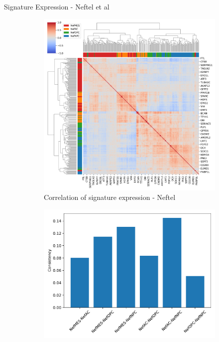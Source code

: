 \documentclass[aspectratio=169,9pt]{beamer}
\begin{document}
    \begin{frame}{Signature Expression - Neftel et al}
        \begin{adjustwidth}{-5cm}{-5cm}
            \centering
            \begin{figure}\ContinuedFloat
                \centering
                \begin{subfigure}[c]{0.48\textwidth}
                    \centering
                    \includegraphics[width=\textwidth]{GSM3828672_Corrplot_Nef}
                    \caption{Correlation of signature expression - Neftel}
                \end{subfigure}
                \begin{subfigure}[c]{0.4\textwidth}
                    \centering
                    \includegraphics[width=\textwidth]{GSM3828672_Consistency_Nef}

\end{subfigure}
\end{figure}
\end{adjustwidth}
\end{frame}
\end{document}
